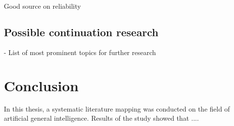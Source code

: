 \documentclass[utf8,english]{gradu3}
\begin{document}
Good source on reliability \cite{wohlin2013}

\section{Possible continuation research}

- List of most prominent topics for further research

\chapter{Conclusion}
In this thesis, a systematic literature mapping was conducted on the field of
artificial general intelligence. Results of the study showed that ....

\printbibliography
\end{document}
